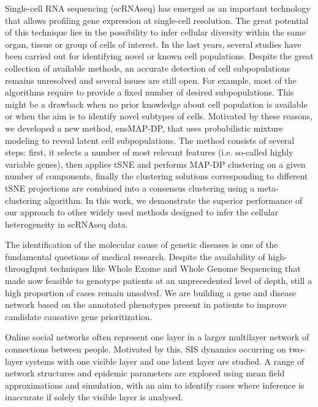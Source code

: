 Single-cell RNA sequencing (scRNAseq) has emerged as an important technology that allows profiling gene expression at single-cell resolution. The great potential of this technique lies in the possibility to infer cellular diversity within the same organ, tissue or group of cells of interest. In the last years, several studies have been carried out for identifying novel or known cell populations. Despite the great collection of available methods, an accurate detection of cell subpopulations remains unresolved and several issues are still open. For example, most of the algorithms require to provide a fixed number of
desired subpopulations. This might be a drawback when no prior knowledge about cell population is available or when the aim is to identify novel subtypes of cells. Motivated by these reasons, we developed a new method, ensMAP-DP, that uses probabilistic mixture modeling to reveal latent cell subpopulations. The method consists of several steps: first, it selects a number of most relevant features (i.e. so-called highly variable genes), then applies tSNE and performs MAP-DP clustering on a given number of
components, finally the clustering solutions corresponding to different tSNE projections are combined into a consensus clustering using a meta-clustering algorithm. In this work, we demonstrate the superior performance of our approach to other widely used methods designed to infer the cellular heterogeneity in scRNAseq data.


The identification of the molecular cause of genetic diseases is one of the fundamental questions of medical research. Despite the availability of high-throughput techniques like Whole Exome and Whole Genome Sequencing that made now  feasible to genotype patients at an unprecedented level of depth, still a high proportion of cases remain unsolved. We are building a gene and disease network based on the annotated phenotypes present in patients to improve candidate causative gene prioritization.

Online social networks often represent one layer in a larger multilayer network of connections between people. Motivated by this, SIS dynamics occurring on two-layer systems with one visible layer and one latent layer are studied. A range of network structures and epidemic parameters are explored using mean field approximations and simulation, with an aim to identify cases where inference is inaccurate if solely the visible layer is analysed.

